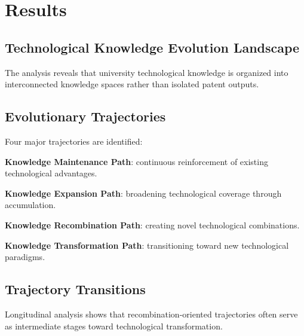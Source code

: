 
\section{Results}

\subsection{Technological Knowledge Evolution Landscape}

The analysis reveals that university technological knowledge is organized into interconnected knowledge spaces rather than isolated patent outputs.

\subsection{Evolutionary Trajectories}

Four major trajectories are identified:

\textbf{Knowledge Maintenance Path}: continuous reinforcement of existing technological advantages.

\textbf{Knowledge Expansion Path}: broadening technological coverage through accumulation.

\textbf{Knowledge Recombination Path}: creating novel technological combinations.

\textbf{Knowledge Transformation Path}: transitioning toward new technological paradigms.

\subsection{Trajectory Transitions}

Longitudinal analysis shows that recombination-oriented trajectories often serve as intermediate stages toward technological transformation.
